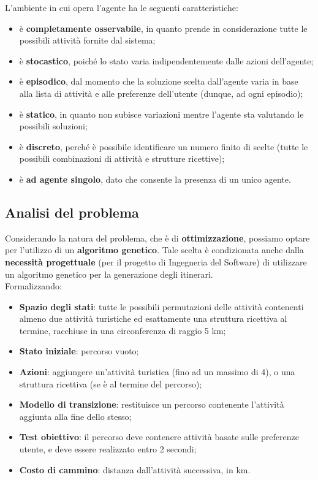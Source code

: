 \documentclass{CSUniSchoolLabReport}
\begin{document}
L'ambiente in cui opera l'agente ha le seguenti caratteristiche:
\begin{itemize}
 \item è \textbf{completamente osservabile}, in quanto prende in considerazione tutte le possibili attività fornite dal sistema;
 \item è \textbf{stocastico}, poiché lo stato varia indipendentemente dalle azioni dell'agente;
 \item è \textbf{episodico}, dal momento che la soluzione scelta dall'agente varia in base alla lista di attività e alle preferenze dell'utente (dunque, ad ogni episodio);
 \item è \textbf{statico}, in quanto non subisce variazioni mentre l'agente sta valutando le possibili soluzioni;
 \item è \textbf{discreto}, perché è possibile identificare un numero finito di scelte (tutte le possibili combinazioni di attività e strutture ricettive);
 \item è \textbf{ad agente singolo}, dato che consente la presenza di un unico agente.
\end{itemize}

\pagebreak

\subsection{Analisi del problema}

Considerando la natura del problema, che è di \textbf{ottimizzazione}, possiamo optare per l'utilizzo di un \textbf{algoritmo genetico}. Tale scelta è condizionata anche dalla \textbf{necessità progettuale} (per il progetto di Ingegneria del Software) di utilizzare un algoritmo genetico per la generazione degli itinerari. \\
Formalizzando:
\begin{itemize}
    \item \textbf{Spazio degli stati}: tutte le possibili permutazioni delle attività contenenti almeno due attività turistiche ed esattamente una struttura ricettiva al termine, racchiuse in una circonferenza di raggio 5 km;
    \item \textbf{Stato iniziale}: percorso vuoto;
    \item \textbf{Azioni}: aggiungere un'attività turistica (fino ad un massimo di 4), o una struttura ricettiva (se è al termine del percorso);
    \item \textbf{Modello di transizione}: restituisce un percorso contenente l'attività aggiunta alla fine dello stesso;
    \item \textbf{Test obiettivo}: il percorso deve contenere attività basate sulle preferenze utente, e deve essere realizzato entro 2 secondi;
    \item \textbf{Costo di cammino}: distanza dall'attività successiva, in km.
\end{itemize}
\end{document}
